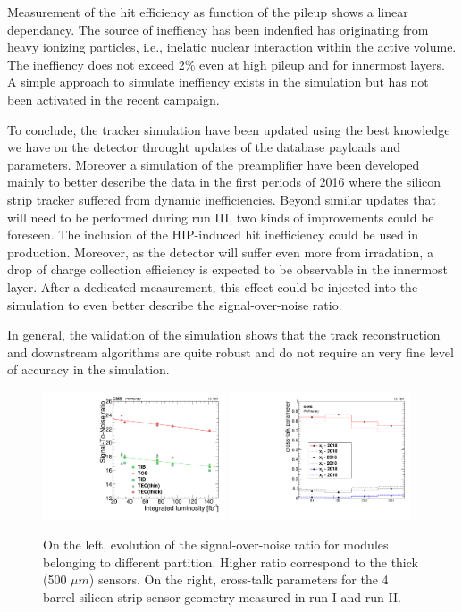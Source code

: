 Measurement of the hit efficiency as function of the pileup shows a linear dependancy.
The source of ineffiency has been indenfied has originating from heavy ionizing particles, i.e., inelatic nuclear interaction within the active volume.
The ineffiency does not exceed 2\% even at high pileup and for innermost layers.
A simple approach to simulate ineffiency exists in the simulation but has not been activated in the recent campaign.

To conclude, the tracker simulation have been updated using the best knowledge we have on the detector throught updates of the database payloads and parameters.
Moreover a simulation of the preamplifier have been developed mainly to better describe the data in the first periods  of 2016 where the silicon strip tracker suffered from dynamic inefficiencies.
Beyond similar updates that will need to be performed during run III, two kinds of improvements could be foreseen.
The inclusion of the HIP-induced hit inefficiency could be used in production.
Moreover, as the detector will suffer even more from irradation, a drop of charge collection efficiency is expected to be observable in the innermost layer.
After a dedicated measurement,  this effect could be  injected into the simulation to even better describe the signal-over-noise ratio.

In general, the validation of the simulation shows that the track reconstruction and downstream algorithms are quite robust and do not require an very fine level of accuracy in the simulation.


\begin{figure}
\center
\label{fig:SiStripPlots}
\caption{On the left, evolution of the signal-over-noise ratio for modules belonging to different partition. Higher ratio correspond to the thick (500 $\mu m$) sensors.
On the right, cross-talk parameters for the 4  barrel silicon strip sensor geometry measured in run I and run II. 
}
\includegraphics[width=0.48\textwidth]{figures/SensorSimulation/StoNTrend_graph.pdf}
\includegraphics[width=0.48\textwidth]{figures/SensorSimulation/Xtalk2018.pdf}
\end{figure}


